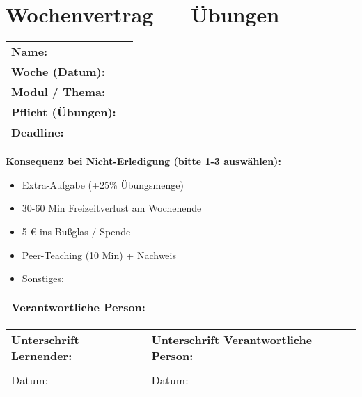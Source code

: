 \documentclass[a5paper,8pt]{article}
\begin{document}
\section*{Wochenvertrag — Übungen}

\begin{tabular}{>{\bfseries}p{5cm}p{7cm}}
Name: & \hrulefill \\
Woche (Datum): & \hrulefill \\
Modul / Thema: & \hrulefill \\
Pflicht (Übungen): & \hrulefill \\
Deadline: & \hrulefill \\
\end{tabular}

\vspace{1cm}

\textbf{Konsequenz bei Nicht-Erledigung (bitte 1-3 auswählen):}

\vspace{5mm}

\begin{itemize}[noitemsep, nolistsep]
    \item Extra-Aufgabe (+25\% Übungsmenge) \\
    \item 30-60 Min Freizeitverlust am Wochenende \\
    \item 5 € ins Bußglas / Spende \\
    \item Peer-Teaching (10 Min) + Nachweis \\
    \item Sonstiges: \hrulefill \\
\end{itemize}

\vspace{10mm}

\begin{tabular}{>{\bfseries}p{5cm}p{7cm}}
Verantwortliche Person: & \hrulefill \\
\end{tabular}

\vspace{10mm}

\begin{tabular}{p{6cm}p{6cm}}
\textbf{Unterschrift Lernender:} & \textbf{Unterschrift Verantwortliche Person:} \\
\vspace{10mm}\hrulefill & \hrulefill \\
Datum: \hrulefill & Datum: \hrulefill \\
\end{tabular}
\end{document}
